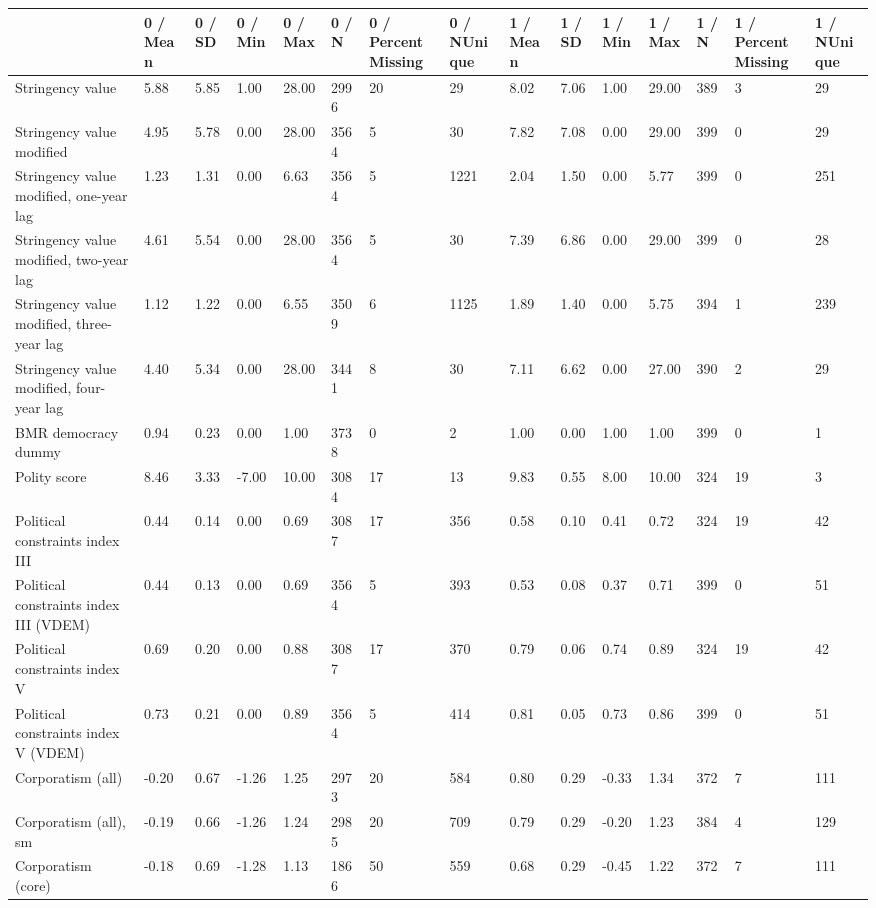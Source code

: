 
\begin{longtable}{lllllllllllllll}
\toprule
  & 0 / Mean & 0 / SD & 0 / Min & 0 / Max & 0 / N & 0 / PercentMissing & 0 / NUnique & 1 / Mean & 1 / SD & 1 / Min & 1 / Max & 1 / N & 1 / PercentMissing & 1 / NUnique\\
\midrule
Stringency value & 5.88 & 5.85 & 1.00 & 28.00 & 2996 & 20 & 29 & 8.02 & 7.06 & 1.00 & 29.00 & 389 & 3 & 29\\
Stringency value modified & 4.95 & 5.78 & 0.00 & 28.00 & 3564 & 5 & 30 & 7.82 & 7.08 & 0.00 & 29.00 & 399 & 0 & 29\\
Stringency value modified, one-year lag & 1.23 & 1.31 & 0.00 & 6.63 & 3564 & 5 & 1221 & 2.04 & 1.50 & 0.00 & 5.77 & 399 & 0 & 251\\
Stringency value modified, two-year lag & 4.61 & 5.54 & 0.00 & 28.00 & 3564 & 5 & 30 & 7.39 & 6.86 & 0.00 & 29.00 & 399 & 0 & 28\\
Stringency value modified, three-year lag & 1.12 & 1.22 & 0.00 & 6.55 & 3509 & 6 & 1125 & 1.89 & 1.40 & 0.00 & 5.75 & 394 & 1 & 239\\
\addlinespace
Stringency value modified, four-year lag & 4.40 & 5.34 & 0.00 & 28.00 & 3441 & 8 & 30 & 7.11 & 6.62 & 0.00 & 27.00 & 390 & 2 & 29\\
BMR democracy dummy & 0.94 & 0.23 & 0.00 & 1.00 & 3738 & 0 & 2 & 1.00 & 0.00 & 1.00 & 1.00 & 399 & 0 & 1\\
Polity score & 8.46 & 3.33 & -7.00 & 10.00 & 3084 & 17 & 13 & 9.83 & 0.55 & 8.00 & 10.00 & 324 & 19 & 3\\
Political constraints index III & 0.44 & 0.14 & 0.00 & 0.69 & 3087 & 17 & 356 & 0.58 & 0.10 & 0.41 & 0.72 & 324 & 19 & 42\\
Political constraints index III (VDEM) & 0.44 & 0.13 & 0.00 & 0.69 & 3564 & 5 & 393 & 0.53 & 0.08 & 0.37 & 0.71 & 399 & 0 & 51\\
\addlinespace
Political constraints index V & 0.69 & 0.20 & 0.00 & 0.88 & 3087 & 17 & 370 & 0.79 & 0.06 & 0.74 & 0.89 & 324 & 19 & 42\\
Political constraints index V (VDEM) & 0.73 & 0.21 & 0.00 & 0.89 & 3564 & 5 & 414 & 0.81 & 0.05 & 0.73 & 0.86 & 399 & 0 & 51\\
Corporatism (all) & -0.20 & 0.67 & -1.26 & 1.25 & 2973 & 20 & 584 & 0.80 & 0.29 & -0.33 & 1.34 & 372 & 7 & 111\\
Corporatism (all), sm & -0.19 & 0.66 & -1.26 & 1.24 & 2985 & 20 & 709 & 0.79 & 0.29 & -0.20 & 1.23 & 384 & 4 & 129\\
Corporatism (core) & -0.18 & 0.69 & -1.28 & 1.13 & 1866 & 50 & 559 & 0.68 & 0.29 & -0.45 & 1.22 & 372 & 7 & 111\\

\end{longtable}
